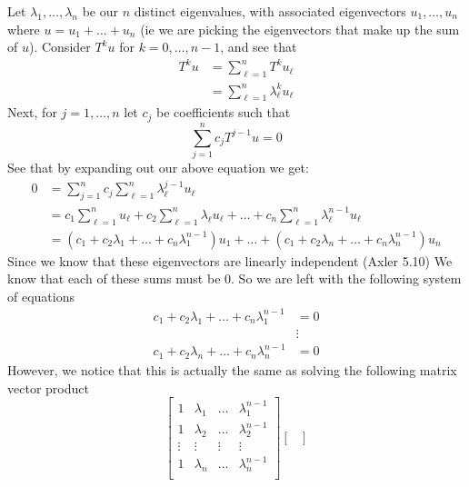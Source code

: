 \documentclass[answers]{exam}
\begin{document}
\begin{questions}
\begin{parts}
\begin{solution}
            Let $\lambda_1,\dots,\lambda_n$ be our $n$ distinct eigenvalues, with associated eigenvectors
            $u_1,\dots,u_n$ where $u = u_1 + \dots + u_n$ (ie we are picking the eigenvectors that make up
            the sum of $u$). Consider $T^ku$ for $k=0,\dots,n-1$, and see that
            \begin{align*}
                T^ku &= \sum_{\ell=1}^nT^ku_\ell \\
                     &= \sum_{\ell=1}^n\lambda_\ell^ku_\ell
            \end{align*}
            Next, for $j=1,\dots,n$ let $c_j$ be coefficients such that
            \[
                \sum_{j=1}^nc_jT^{j-1}u = 0
            \]
            See that by expanding out our above equation we get:
            \begin{align*}
                0 &= \sum_{j=1}^n c_j\sum_{\ell=1}^n\lambda_\ell^{j-1}u_\ell\\
                  &= c_1\sum_{\ell=1}^nu_\ell + c_2\sum_{\ell=1}^n\lambda_\ell u_\ell + \dots + c_n\sum_{\ell=1}^n\lambda_\ell^{n-1}u_\ell \\
                  &= (c_1 + c_2\lambda_1 + \dots + c_n\lambda_1^{n-1})u_1 + \dots + (c_1 + c_2\lambda_n + \dots + c_n\lambda_n^{n-1})u_n
            \end{align*}
            Since we know that these eigenvectors are linearly independent (Axler 5.10) We know that each of 
            these sums must be $0$. So we are left with the following system of equations
            \begin{align*}
                c_1 + c_2\lambda_1 + \dots + c_n\lambda_1^{n-1} &= 0\\
                &\vdots\\
                c_1 + c_2\lambda_n + \dots + c_n\lambda_n^{n-1} &= 0
            \end{align*}
            However, we notice that this is actually the same as solving the following matrix vector product
            \[
                \begin{bmatrix}
                    1 & \lambda_1 & \dots & \lambda_1^{n-1} \\
                    1 & \lambda_2 & \dots & \lambda_2^{n-1} \\
                    \vdots&\vdots&\vdots&\vdots\\
                    1 & \lambda_n & \dots & \lambda_n^{n-1} \\
                \end{bmatrix}\begin{bmatrix}

\end{bmatrix}\]
\end{solution}
\end{parts}
\end{questions}
\end{document}
